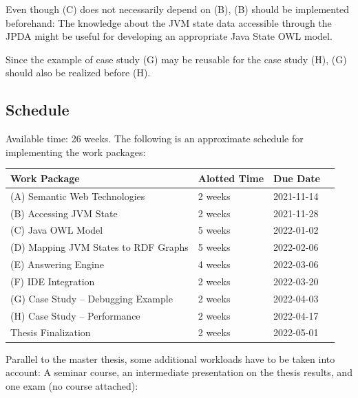 \documentclass[
	english,
	accentcolor=9c,%
  marginpar=0cm %
	]{tudapub}
\begin{document}
Even though (C) does not necessarily depend on (B), (B) should be implemented
beforehand: The knowledge about the JVM state data accessible through the JPDA
might be useful for developing an appropriate Java State OWL model.

Since the example of case study (G) may be reusable for the case study (H), (G)
should also be realized before (H).

\subsection{Schedule}

Available time: 26 weeks. The following is an approximate schedule for
implementing the work packages:
\bigskip

\begin{center}
  \begin{tabular}{llll}
    \toprule
    Work Package & Alotted Time & Due Date\\
    \midrule
    (A) Semantic Web Technologies        & 2 weeks & 2021-11-14 \\
    (B) Accessing JVM State              & 2 weeks & 2021-11-28 \\ %
    (C) Java OWL Model                   & 5 weeks & 2022-01-02 \\ 
    (D) Mapping JVM States to RDF Graphs & 5 weeks & 2022-02-06 \\ %
    (E) Answering Engine                 & 4 weeks & 2022-03-06 \\ %
    (F) IDE Integration                  & 2 weeks & 2022-03-20 \\
    (G) Case Study -- Debugging Example  & 2 weeks & 2022-04-03 \\
    (H) Case Study -- Performance        & 2 weeks & 2022-04-17 \\
    Thesis Finalization                  & 2 weeks & 2022-05-01 \\
    \bottomrule
  \end{tabular}
\end{center}

\bigskip
\noindent
Parallel to the master thesis, some additional workloads have to be taken
into account: A seminar course, an intermediate presentation on the thesis
results, and one exam (no course attached):
\end{document}
